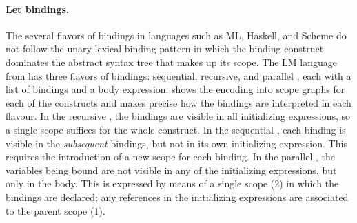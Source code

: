 \paragraph{Let bindings.}

The several flavors of  bindings in languages such as ML, Haskell, and
Scheme do not follow the unary lexical binding pattern in which the binding
construct dominates the abstract syntax tree that makes up its scope.
The LM language from  has three flavors of  bindings:
sequential, recursive, and parallel , each with a list of bindings and
a body expression.
 shows the encoding into scope graphs for each of the constructs
and makes precise how the bindings are interpreted in each flavour.
In the recursive , the bindings are visible in all initializing
expressions, so a single scope suffices for the whole construct.
In the sequential , each binding is visible in the
\emph{subsequent} bindings, but not in its own initializing expression. This
requires the introduction of a new scope for each binding.
In the parallel , the variables being bound are not
visible in any of the initializing expressions, but only in the body.
This is expressed by means of a single scope (2) in which the bindings are
declared; any references in the initializing expressions are associated to the
parent scope (1).

